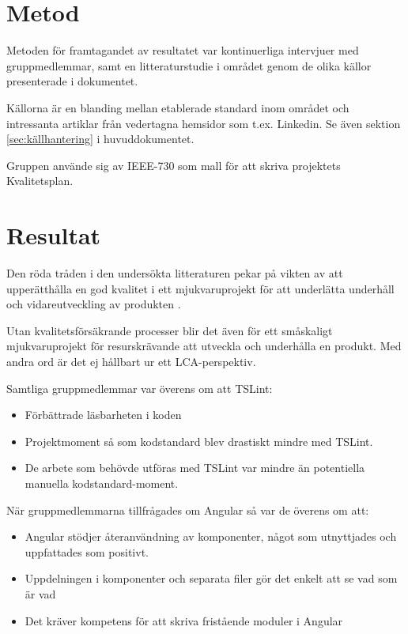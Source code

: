 \section{Metod}

Metoden för framtagandet av resultatet var kontinuerliga intervjuer med gruppmedlemmar, samt en litteraturstudie i området genom de olika källor presenterade i dokumentet.

Källorna är en blanding mellan etablerade standard inom området och intressanta artiklar från vedertagna hemsidor som t.ex. Linkedin. Se även sektion \ref{sec:källhantering} i huvuddokumentet.

Gruppen använde sig av IEEE-730 som mall för att skriva projektets Kvalitetsplan.

\section{Resultat}

Den röda tråden i den undersökta litteraturen pekar på vikten av att upperätthålla en god kvalitet i ett mjukvaruprojekt för att underlätta underhåll och vidareutveckling av produkten \cite{sustainable}\cite{altexsoft}\cite{ISOtor}\cite{LCA}. 

Utan kvalitetsförsäkrande processer blir det även för ett småskaligt mjukvaruprojekt för resurskrävande att utveckla och underhålla en produkt. Med andra ord är det ej hållbart ur ett LCA-perspektiv.

Samtliga gruppmedlemmar var överens om att TSLint:

\begin{itemize}
	\item Förbättrade läsbarheten i koden
	\item Projektmoment så som kodstandard blev drastiskt mindre med TSLint.
	\item De arbete som behövde utföras med TSLint var mindre än potentiella manuella kodstandard-moment.
\end{itemize}

När gruppmedlemmarna tillfrågades om Angular så var de överens om att:

\begin{itemize}
	\item Angular stödjer återanvändning av komponenter, något som utnyttjades och uppfattades som positivt.
	\item Uppdelningen i komponenter och separata filer gör det enkelt att se vad som är vad
	\item Det kräver kompetens för att skriva fristående moduler i Angular
\end{itemize}

